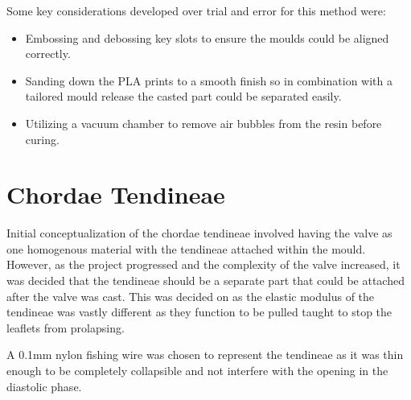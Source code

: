 Some key considerations developed over trial and error for this method were:

\begin{itemize}
  \item Embossing and debossing key slots to ensure the moulds could be aligned correctly.
  \item Sanding down the \gls{PLA} prints to a smooth finish so in combination with a tailored mould release the casted part could be separated easily.
  \item Utilizing a vacuum chamber to remove air bubbles from the resin before curing.
\end{itemize}


\section{Chordae Tendineae }
Initial conceptualization of the chordae tendineae involved having the valve as one homogenous material with the tendineae attached within the mould. However, as the project progressed and the complexity of the valve increased, it was decided that the tendineae should be a separate part that could be attached after the valve was cast. This was decided on as the elastic modulus of the tendineae was vastly different as they function to be pulled taught to stop the leaflets from prolapsing.

A 0.1mm nylon fishing wire was chosen to represent the tendineae as it was thin enough to be completely collapsible and not interfere with the opening in the diastolic phase.

